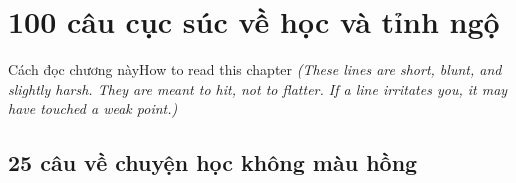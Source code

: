 \chapter{100 câu cục súc về học và tỉnh ngộ}

\begin{truyen}{Cách đọc chương này}{How to read this chapter}
\textit{(These lines are short, blunt, and slightly harsh. They are meant to hit, not to flatter. If a line irritates you, it may have touched a weak point.)}
\end{truyen}

\section{25 câu về chuyện học không màu hồng}
